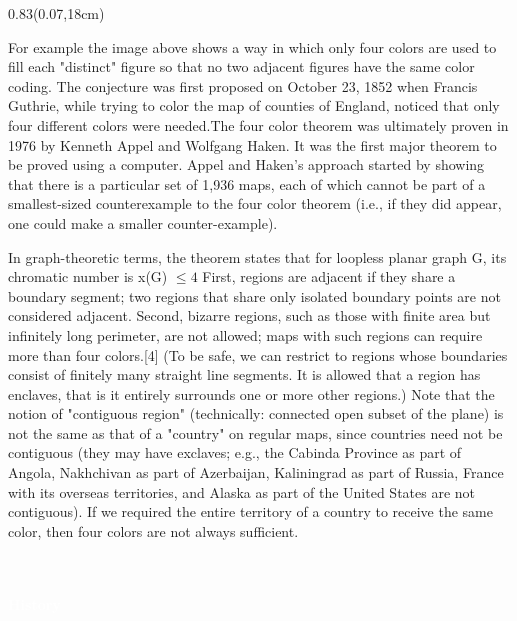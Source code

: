 \documentclass[11pt,a4paper,twoside]{book}
\newenvironment{positionedparagraph}[4]{%
	\begin{textblock*}{#1}(#2,#3)
		\noindent\textbf{#4}\par\medskip
	}{%
	\end{textblock*}
}
\begin{document}
\begin{positionedparagraph}{0.83\textwidth}{0.07\textwidth}{18cm}
 \
 For example the image above shows a way in which only four colors are used to fill each "distinct" figure so that no two adjacent figures have the same color coding. The conjecture was first proposed on October 23, 1852 when Francis Guthrie, while trying to color the map of counties of England, noticed that only four different colors were needed.The four color theorem was ultimately proven in 1976 by Kenneth Appel and Wolfgang Haken. It was the first major theorem to be proved using a computer. Appel and Haken's approach started by showing that there is a particular set of 1,936 maps, each of which cannot be part of a smallest-sized counterexample to the four color theorem (i.e., if they did appear, one could make a smaller counter-example).
 
 In graph-theoretic terms, the theorem states that for loopless planar graph G, its chromatic number is x(G) $\le 4$
 First, regions are adjacent if they share a boundary segment; two regions that share only isolated boundary points are not considered adjacent. Second, bizarre regions, such as those with finite area but infinitely long perimeter, are not allowed; maps with such regions can require more than four colors.[4] (To be safe, we can restrict to regions whose boundaries consist of finitely many straight line segments. It is allowed that a region has enclaves, that is it entirely surrounds one or more other regions.) Note that the notion of "contiguous region" (technically: connected open subset of the plane) is not the same as that of a "country" on regular maps, since countries need not be contiguous (they may have exclaves; e.g., the Cabinda Province as part of Angola, Nakhchivan as part of Azerbaijan, Kaliningrad as part of Russia, France with its overseas territories, and Alaska as part of the United States are not contiguous). If we required the entire territory of a country to receive the same color, then four colors are not always sufficient.
\end{positionedparagraph}

\newpage

\begin{tcolorbox}[colback=blue!48, colframe=blue!48, width=\linewidth, boxrule=0pt, arc=0pt, outer arc=0pt, sharp corners]\textcolor{white}{\textbf{\\ \\  \Huge History \\}}
\end{tcolorbox}
\end{document}

